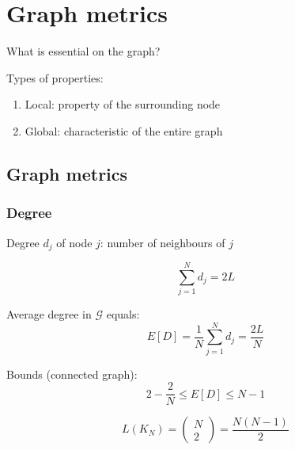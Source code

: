 
\section{Graph metrics}

What is essential on the graph?

Types of properties:
\begin{enumerate}
  \item Local: property of the surrounding node
  \item Global: characteristic of the entire graph
\end{enumerate}

\subsection{Graph metrics}
\subsubsection{Degree}

Degree $d_j$ of node $j$: number of neighbours of $j$

\begin{figure}
  \centering
\end{figure}

$$
\sum_{j=1}^N d_j = 2L
$$

Average degree in $\mathcal{G}$ equals:
$$
E[D] = \frac{1}{N} \sum_{j=1}^N d_j = \frac{2L}{N}
$$

Bounds (connected graph):
$$
2 - \frac{2}{N} \le E[D] \le N-1
$$

$$
L(K_N) = 
\begin{pmatrix}
  N \\ 2
\end{pmatrix} = \frac{N (N-1)}{2}
$$

